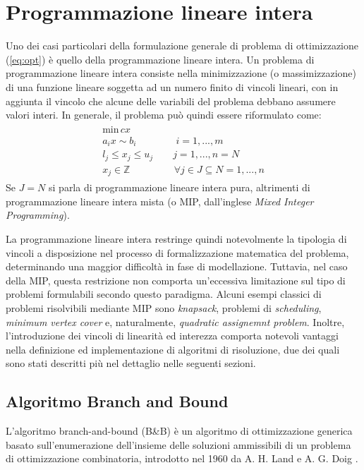 \section{Programmazione lineare intera}
Uno dei casi particolari della formulazione generale di problema di ottimizzazione (\ref{eq:opt}) è quello della programmazione lineare intera.
Un problema di programmazione lineare intera consiste nella minimizzazione (o massimizzazione) di una funzione lineare soggetta ad un 
numero finito di vincoli lineari, con in aggiunta il vincolo che alcune delle variabili del problema debbano assumere valori interi. 
In generale, il problema può quindi essere riformulato come:
\begin{align*}
	\begin{array}{l}
      \text{min} \, cx\\
      a_i x \sim b_i \qquad\qquad i=1,...,m \\
      l_j \leq x_j \leq u_j \qquad j=1,...,n =N \\
      x_j \in \mathbb{Z}  \;\,\qquad\qquad \forall j \in J \subseteq N = {1,...,n}	
	\end{array}
\end{align*}
\indent
Se $J=N$ si parla di programmazione lineare intera pura, altrimenti di programmazione lineare intera mista (o MIP, dall'inglese 
\textit{Mixed Integer Programming}).

La programmazione lineare intera restringe quindi notevolmente la tipologia di vincoli a disposizione nel
processo di formalizzazione matematica del problema, determinando una maggior difficoltà in fase di modellazione.
Tuttavia, nel caso della MIP, questa restrizione non comporta un'eccessiva limitazione sul tipo di 
problemi formulabili secondo questo paradigma. Alcuni esempi classici di problemi risolvibili mediante MIP sono \textit{knapsack}, problemi di 
\textit{scheduling}, \textit{minimum vertex cover} e, naturalmente, \textit{quadratic assignemnt problem}.
Inoltre, l'introduzione dei vincoli di linearità ed interezza comporta notevoli vantaggi nella definizione ed
implementazione di algoritmi di risoluzione, due dei quali sono stati descritti più nel dettaglio nelle seguenti sezioni.

\subsection{Algoritmo Branch and Bound}
L'algoritmo branch-and-bound (B\&B) è un algoritmo di ottimizzazione generica basato sull'enumerazione dell'insieme delle soluzioni
ammissibili di un problema di ottimizzazione combinatoria, introdotto nel 1960 da A. H. Land e A. G. Doig \cite{10.2307/1910129}. 

